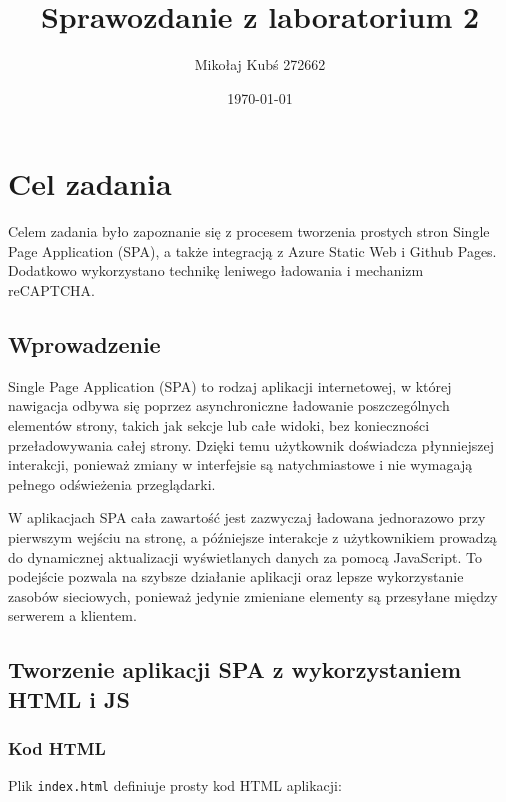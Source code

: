 \documentclass[a4paper,12pt]{article}
\title{Sprawozdanie z laboratorium 2}
\author{Mikołaj Kubś 272662}
\date{\today}
\begin{document}
\maketitle

\section{Cel zadania}
Celem zadania było zapoznanie się z procesem tworzenia prostych stron Single Page Application (SPA), a także integracją z Azure Static Web i Github Pages. Dodatkowo wykorzystano technikę leniwego ładowania i mechanizm reCAPTCHA.

\subsection{Wprowadzenie}
Single Page Application (SPA) to rodzaj aplikacji internetowej, w której nawigacja odbywa się poprzez asynchroniczne ładowanie poszczególnych elementów strony, takich jak sekcje lub całe widoki, bez konieczności przeładowywania całej strony. Dzięki temu użytkownik doświadcza płynniejszej interakcji, ponieważ zmiany w interfejsie są natychmiastowe i nie wymagają pełnego odświeżenia przeglądarki.

W aplikacjach SPA cała zawartość jest zazwyczaj ładowana jednorazowo przy pierwszym wejściu na stronę, a późniejsze interakcje z użytkownikiem prowadzą do dynamicznej aktualizacji wyświetlanych danych za pomocą JavaScript. To podejście pozwala na szybsze działanie aplikacji oraz lepsze wykorzystanie zasobów sieciowych, ponieważ jedynie zmieniane elementy są przesyłane między serwerem a klientem.

\subsection{Tworzenie aplikacji SPA z wykorzystaniem HTML i JS}

\subsubsection{Kod HTML}
Plik \texttt{index.html} definiuje prosty kod HTML aplikacji:
\end{document}
